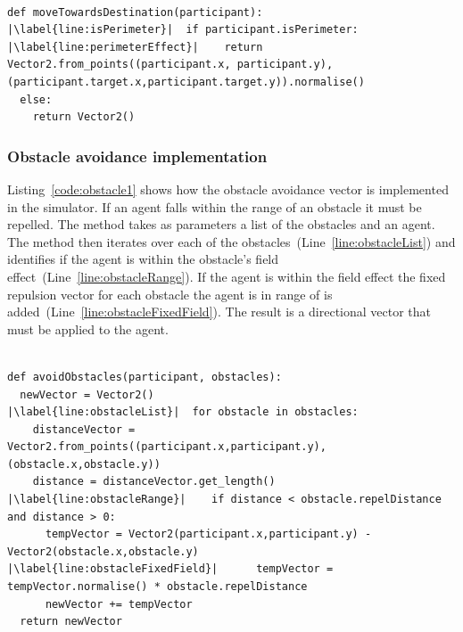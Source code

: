 \lstset{language=Python,
basicstyle=\tiny,
numbers=left, 
numberstyle=\tiny,
captionpos=b,
frame=single,
breaklines=true,
caption=Repulsion code,
escapechar=|
} %
\begin{lstlisting}[label={code:destination1}]  % Start your code-block

def moveTowardsDestination(participant):
|\label{line:isPerimeter}|  if participant.isPerimeter:
|\label{line:perimeterEffect}|    return Vector2.from_points((participant.x, participant.y),(participant.target.x,participant.target.y)).normalise()
  else:
    return Vector2()
\end{lstlisting}

\subsubsection{Obstacle avoidance implementation}
Listing~\ref{code:obstacle1} shows how the obstacle avoidance vector is implemented in the simulator. If an agent falls within the range of an obstacle it must be repelled. The method takes as parameters a list of the obstacles and an agent. The method then iterates over each of the obstacles~(Line~\ref{line:obstacleList}) and identifies if the agent is within the obstacle's field effect~(Line~\ref{line:obstacleRange}). If the agent is within the field effect the fixed repulsion vector for each obstacle the agent is in range of is added~(Line~\ref{line:obstacleFixedField}). The result is a directional vector that must be applied to the agent.
 
\lstset{language=Python,
basicstyle=\tiny,
numbers=left, 
numberstyle=\tiny,
captionpos=b,
frame=single,
breaklines=true,
caption=Obstacle avoidance code,
escapechar=|
} %
\begin{lstlisting}[label={code:obstacle1}]  % Start your code-block

def avoidObstacles(participant, obstacles):
  newVector = Vector2()
|\label{line:obstacleList}|  for obstacle in obstacles:
    distanceVector = Vector2.from_points((participant.x,participant.y),(obstacle.x,obstacle.y))
    distance = distanceVector.get_length()
|\label{line:obstacleRange}|    if distance < obstacle.repelDistance and distance > 0:
      tempVector = Vector2(participant.x,participant.y) - Vector2(obstacle.x,obstacle.y)
|\label{line:obstacleFixedField}|      tempVector = tempVector.normalise() * obstacle.repelDistance
      newVector += tempVector
  return newVector
\end{lstlisting}

